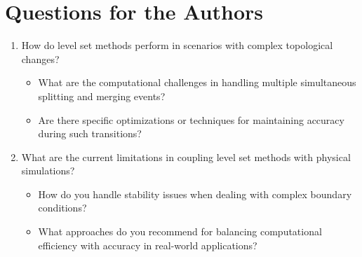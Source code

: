 \documentclass[12pt]{article}
\begin{document}
\section{Questions for the Authors}
\begin{enumerate}[noitemsep]
    \item How do level set methods perform in scenarios with complex topological changes?
    \begin{itemize}[noitemsep]
        \item What are the computational challenges in handling multiple simultaneous splitting and merging events?
        \item Are there specific optimizations or techniques for maintaining accuracy during such transitions?
    \end{itemize}
    \item What are the current limitations in coupling level set methods with physical simulations?
    \begin{itemize}[noitemsep]
        \item How do you handle stability issues when dealing with complex boundary conditions?
        \item What approaches do you recommend for balancing computational efficiency with accuracy in real-world applications?
    \end{itemize}
\end{enumerate}
\end{document}
